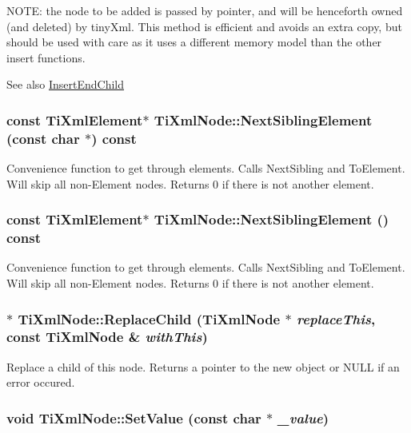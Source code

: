 NOTE: the node to be added is passed by pointer, and will be henceforth owned (and deleted) by tinyXml. This method is efficient and avoids an extra copy, but should be used with care as it uses a different memory model than the other insert functions.

\begin{DoxySeeAlso}{See also}
\hyperlink{class_ti_xml_node_ad7d4630e1a2a916edda16be22448a8ba}{InsertEndChild} 
\end{DoxySeeAlso}
\hypertarget{class_ti_xml_node_a071ba77fd7ab79402fa84b7e9b8607b3}{
\subsubsection[{NextSiblingElement}]{\setlength{\rightskip}{0pt plus 5cm}const {\bf TiXmlElement}$\ast$ TiXmlNode::NextSiblingElement (const char $\ast$) const}}
\label{class_ti_xml_node_a071ba77fd7ab79402fa84b7e9b8607b3}
Convenience function to get through elements. Calls NextSibling and ToElement. Will skip all non-\/Element nodes. Returns 0 if there is not another element. \hypertarget{class_ti_xml_node_a73acf929d49d10bd0e5fb3d31b0372d1}{
\subsubsection[{NextSiblingElement}]{\setlength{\rightskip}{0pt plus 5cm}const {\bf TiXmlElement}$\ast$ TiXmlNode::NextSiblingElement () const}}
\label{class_ti_xml_node_a73acf929d49d10bd0e5fb3d31b0372d1}
Convenience function to get through elements. Calls NextSibling and ToElement. Will skip all non-\/Element nodes. Returns 0 if there is not another element. \hypertarget{class_ti_xml_node_a0c49e739a17b9938050c22cd89617fbd}{
\subsubsection[{ReplaceChild}]{$\ast$ TiXmlNode::ReplaceChild ({\bf TiXmlNode} $\ast$ {\em replaceThis}, \/  const {\bf TiXmlNode} \& {\em withThis})}}
\label{class_ti_xml_node_a0c49e739a17b9938050c22cd89617fbd}
Replace a child of this node. Returns a pointer to the new object or NULL if an error occured. \hypertarget{class_ti_xml_node_a2a38329ca5d3f28f98ce932b8299ae90}{
\subsubsection[{SetValue}]{\setlength{\rightskip}{0pt plus 5cm}void TiXmlNode::SetValue (const char $\ast$ {\em \_\-value})}}

